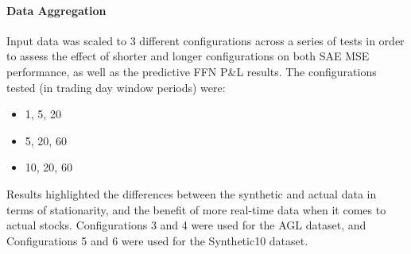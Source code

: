 \documentclass[a4paper,latin]{paper}
\begin{document}



\paragraph{Data Aggregation}

Input data was scaled to 3 different configurations across a series of tests in order to assess the effect of shorter and longer configurations on both SAE MSE performance, as well as the predictive FFN P\&L results. The configurations tested (in trading day window periods) were:

\begin{itemize}
	\item 1, 5, 20
	\item 5, 20, 60
	\item 10, 20, 60
\end{itemize}

Results highlighted the differences between the synthetic and actual data in terms of stationarity, and the benefit of more real-time data when it comes to actual stocks. Configurations 3 and 4 were used for the AGL dataset, and Configurations 5 and 6 were used for the Synthetic10 dataset.

\end{document}
